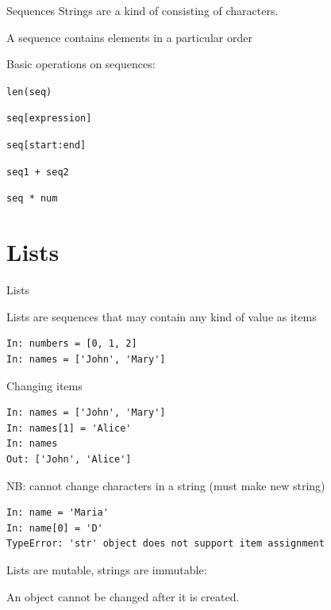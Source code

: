 \documentclass[aspectratio=169,usenames,dvipsnames]{beamer}
\begin{document}
\begin{frame}{Sequences}
    Strings are a kind of 
    consisting of characters.

    \vspace{1em}
    A sequence contains elements in a particular order

    \vspace{1em}
    Basic operations on sequences:
    \begin{description}[concatenation:]
        \item[getting length:]     \texttt{len(seq)}
        \item[indexing:]           \texttt{seq[expression]}
        \item[slicing:]            \texttt{seq[start:end]}
        \item[concatenation:]      \texttt{seq1 + seq2}
        \item[repetition:]         \texttt{seq * num}
    \end{description}
\end{frame}


\section{Lists}
\frame{\tableofcontents[currentsection]}

\begin{frame}[fragile]{Lists}
    \begin{definition}
    Lists are sequences that may contain any kind of value as items
    \end{definition}
\begin{lstlisting} 
In: numbers = [0, 1, 2]
In: names = ['John', 'Mary']
\end{lstlisting} 
\end{frame}

\begin{frame}[fragile]{Changing items}
\begin{lstlisting} 
In: names = ['John', 'Mary']
In: names[1] = 'Alice'
In: names
Out: ['John', 'Alice']
\end{lstlisting} 

\pause
NB: cannot change characters in a string (must make new string)
\begin{lstlisting} 
In: name = 'Maria'
In: name[0] = 'D'
TypeError: 'str' object does not support item assignment
\end{lstlisting}

Lists are mutable, strings are immutable:
\begin{definition}
An  object cannot be changed after it is created.
\end{definition}
\end{frame}
\end{document}
